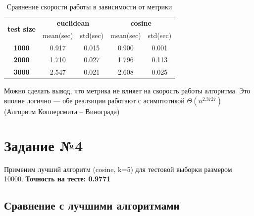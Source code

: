 \documentclass[12pt,fleqn]{article}
\begin{document}
\begin{table}[htb]
    \centering
    \begin{tabular}{|c|c|c|c|c|}
    \hline
    \multirow{2}{*}{\textbf{test size}} & \multicolumn{2}{c|}{\textbf{euclidean}} & \multicolumn{2}{c|}{\textbf{cosine}} \\ \cline{2-5} 
                                        & mean(sec)           & std(sec)          & mean(sec)         & std(sec)         \\ \hline
    \textbf{1000}                       & 0.917               & 0.015             & 0.900             & 0.001            \\ \hline
    \textbf{2000}                       & 1.710               & 0.027             & 1.796             & 0.113            \\ \hline
    \textbf{3000}                       & 2.547               & 0.021             & 2.608             & 0.025           \\ \hline
    \end{tabular}
    \caption{Сравнение скорости работы в зависимости от метрики}
\end{table}

Можно сделать вывод, что метрика не влияет на скорость работы алгоритма. Это вполне логично ---
 обе реалзиции работают с асимптотикой $\Theta(n^{2.3727})$ (Алгоритм Копперсмита -- Винограда)
\newpage
\section{Задание №4}
Применим лучший алгоритм (cosine, k=5) для тестовой выборки размером 10000. 
\textbf{Точность на тесте: 0.9771}

\subsection{Сравнение с лучшими алгоритмами}
\end{document}
